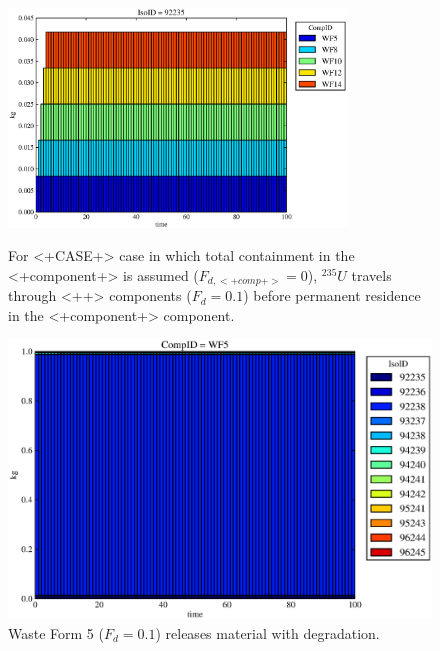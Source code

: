 



\begin{figure}[ht]
\centering
\includegraphics[width=0.8\textwidth]{./chapters/demonstration/no_release/lpEMI.eps}
\caption[$^{235}U$ residence. Lumped Parameter  <+Component+> No Release.]{
For <+CASE+> case in which total containment in the <+component+> is assumed 
($F_{d,<+comp+>}=0$), $^{235}U$ travels through <++> components ($F_d = 0.1$) before 
permanent residence in the <+component+> component.
}
\label{fig:lpEMIall}
\begin{minipage}[b]{0.45\linewidth}

  \includegraphics[width=\textwidth]{./chapters/demonstration/no_release/lpEMI1.eps}
  \caption[LPEMI Waste Form Contaminants.]{
    Waste Form 5 ($F_d = 0.1$) releases material with degradation. 
    }
  \label{fig:lpEMIwf5}
  

\end{minipage}
\end{figure}
